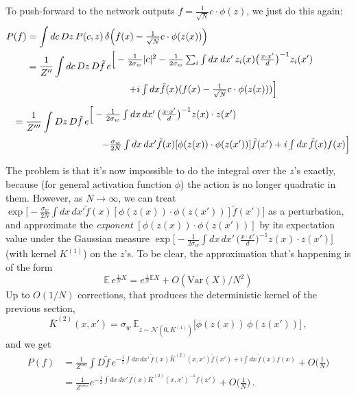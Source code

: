 \documentclass[11pt]{article}
\newcommand{\E}{\mathbb{E}}
\newcommand{\CN}{{\mathcal N}}
\begin{document}
To push-forward to the network outputs $f = \frac{1}{\sqrt N}c\cdot \phi(z)$, we just do this again:
\begin{align}
    P(f) &= \int dc\,Dz\, P(c,z)\, \delta\Big(f(x)-\tfrac{1}{\sqrt N}c\cdot \phi(z(x))\Big) \\
     & = \frac{1}{Z''} \int dc\,Dz\,D\tilde f\, e^{\textstyle  \Big[-\frac{1}{2\sigma_w}|c|^2 - \frac{1}{2\sigma_w} \sum_i \int dx\,dx'\, z_i(x) \big(\frac{x\cdot x'}{d}\big)^{-1}z_i(x')} \notag \\
     & \hspace{1.5in} {}^{\textstyle + i\int dx \tilde f(x)(f(x)-\frac{1}{\sqrt N}c\cdot \phi(z(x))) \Big]} \\
     & \hspace{-.2in} = \frac{1}{Z'''} \int Dz\,D\tilde f\, e^{\textstyle \Big[- \frac{1}{2\sigma_w} \int dx\,dx'\,  \big(\frac{x\cdot x'}{d}\big)^{-1}z(x)\cdot z(x') \Big.} \notag \\
     & \hspace{1.1in} {}^{\textstyle - \frac{\sigma_w}{2N} \int dx\,dx' \tilde f(x)[\phi(z(x))\cdot \phi(z(x'))]\tilde f(x') +i\int dx\, \tilde f(x) f(x)\Big]}
\end{align}
%
The problem is that it's now impossible to do the integral over the $z$'s exactly, because (for general activation function $\phi$) the action is no longer quadratic in them. However, as $N\to \infty$, we can treat $\exp\big[- \frac{\sigma_w}{2N} \int dx\,dx' \tilde f(x)[\phi(z(x))\cdot \phi(z(x'))]\tilde f(x')\big]$ as a perturbation, and approximate the \emph{exponent} $[\phi(z(x))\cdot \phi(z(x'))]$ by its expectation value under the Gaussian measure $\exp\big[- \frac{1}{2\sigma_w} \int dx\,dx'\,  \big(\frac{x\cdot x'}{d}\big)^{-1}z(x)\cdot z(x')\big]$ (with kernel $K^{(1)}$) on the $z$'s. To be clear, the approximation that's happening is of the form
%
\begin{equation} \E \,e^{\frac{1}{N} X} = e^{\frac{1}{N} \E X} + O(\text{Var}(X)/N^2) \end{equation}
%
Up to $O(1/N)$ corrections, that produces the deterministic kernel of the previous section,
%
\begin{equation*}
    \bar K^{(2)}(x,x') = \sigma_w\, \E_{z\sim \CN(0,K^{(1)})}\big[ \phi(z(x))\, \phi(z(x'))\big]\,,
\end{equation*}
%
and we get
%
\begin{align}
    P(f) &= \frac{1}{Z''''} \int D\tilde f\, e^{\textstyle -\frac{1}{2} \int dx\, dx'\, \tilde f(x) \bar K^{(2)}(x,x') \tilde f(x') + i\int dx\, \tilde f(x) f(x)} + O\Big(\frac{1}{N}\Big) \\
     &= \frac{1}{Z'''''} e^{\textstyle -\frac{1}{2} \int dx\, dx'\, f(x) \bar K^{(2)}(x,x')^{-1}  f(x')} +O\Big(\frac{1}{N}\Big) \,.
\end{align}
\end{document}
